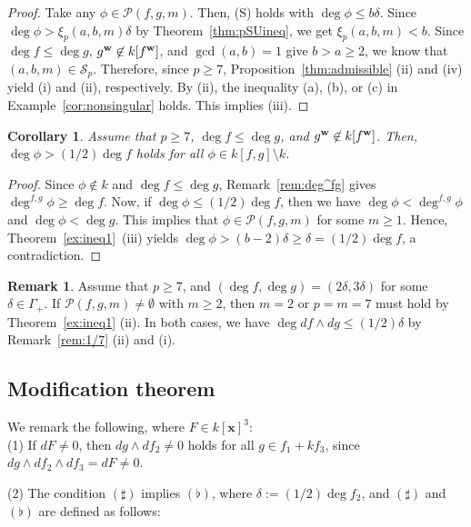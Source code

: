 \documentclass{amsart}
\theoremstyle{plain}
\newtheorem{cor}[thm]{Corollary}
\theoremstyle{definition}
\newtheorem{rem}[thm]{Remark}
\newcommand{\sm}{\setminus}
\newcommand{\nd}{\noindent}
\newcommand{\x}{{\boldsymbol x}}
\newcommand{\w}{{\bf w}}
\newcommand{\kx}{k[\x]}
\begin{document}
\begin{proof}
Take any $\phi \in \mathcal{P}(f,g,m)$. 
Then, (S) holds with $\deg \phi \le b\delta $. 
Since $\deg \phi >\xi _p(a,b,m)\delta $ by Theorem~\ref{thm:pSUineq}, 
we get $\xi _p(a,b,m)<b$. 
Since $\deg f\le \deg g$, $g^{\w }\not\in k[f^{\w }]$, 
and $\gcd (a,b)=1$ give $b>a\ge 2$, 
we know that $(a,b,m)\in \mathcal{S}_p$. 
Therefore, 
since $p\ge 7$, 
Proposition~\ref{thm:admissible} (ii) and (iv) yield (i) and (ii), 
respectively. 
By (ii), 
the inequality (a), (b), or (c) in Example~\ref{cor:nonsingular} holds. 
This implies (iii). 
\end{proof}


\begin{cor}\label{claimm:ineq1}
Assume that $p\ge 7$, 
$\deg f\le \deg g$, and $g^{\w }\not\in k[f^{\w }]$. 
Then, 
$\deg \phi >(1/2)\deg f$ holds for all 
$\phi \in k[f,g]\sm k$. 
\end{cor}

\begin{proof}
Since $\phi \not\in k$ and $\deg f\le \deg g$, 
Remark~\ref{rem:deg^fg} gives $\deg ^{f,g}\phi \ge \deg f$. 
Now, if $\deg \phi \le (1/2)\deg f$, 
then we have $\deg \phi <\deg ^{f,g}\phi $ and $\deg \phi <\deg g$. 
This implies that 
$\phi \in \mathcal{P}(f,g,m)$ for some $m\ge 1$. 
Hence, 
Theorem~\ref{ex:ineq1}~(iii) yields 
$\deg \phi >(b-2)\delta \ge \delta =(1/2)\deg f$, 
a contradiction. 
\end{proof}


\begin{rem}\label{rem:ep<1/7}\rm 
Assume that $p\ge 7$, 
and $(\deg f,\deg g)=(2\delta ,3\delta )$ 
for some $\delta \in \Gamma _+$. 
If $\mathcal{P}(f,g,m)\ne \emptyset $ with $m\ge 2$, 
then $m=2$ or $p=m=7$ must hold by 
Theorem~\ref{ex:ineq1} (ii). 
In both cases, 
we have $\deg df\wedge dg\le (1/2)\delta $ 
by Remark~\ref{rem:1/7} (ii) and (i). 
\end{rem}


\subsection{Modification theorem}\label{sect:modifi}


We remark the following, where $F\in \kx ^3$: \\
(1) If $dF\ne 0$, 
then $dg\wedge df_2\ne 0$ holds for all $g\in f_1+kf_3$, 
since $dg\wedge df_2\wedge df_3=dF\ne 0$. 

\nd 
(2) The condition 
$(\sharp )$ implies $(\flat )$, 
where $\delta :=(1/2)\deg f_2$, 
and $(\sharp )$ and $(\flat )$ are defined as follows: 
\end{document}
